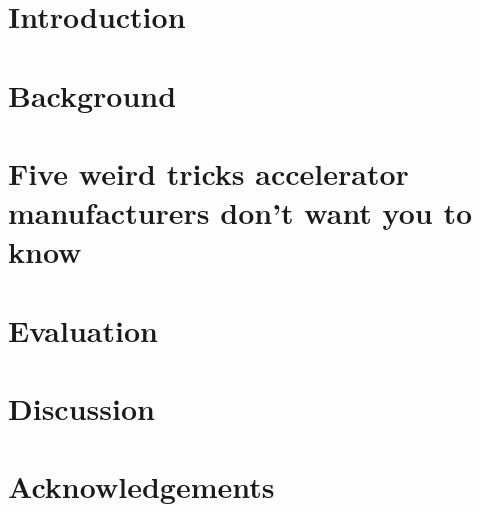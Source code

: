 \documentclass[sigconf,techreport]{acmart}
\begin{document}


\maketitle

\tableofcontents

\section{Introduction}\label{sec:introduction}


\section{Background}\label{sec:background}


\section{Five weird tricks accelerator manufacturers don't want you to know}\label{sec:methodology}


\section{Evaluation}\label{sec:evaluation}


\section{Discussion}\label{sec:discussion}


\section{Acknowledgements}




\appendix

% 
\end{document}
